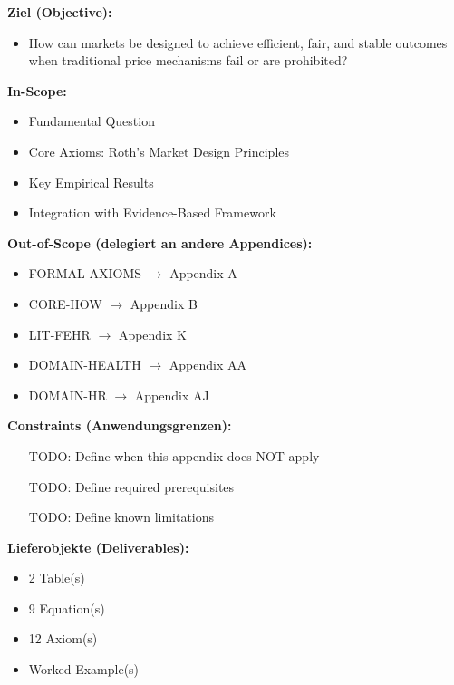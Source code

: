\begin{tcolorbox}[
    colback=orange!5!white,
    colframe=orange!75!black,
    title={\textbf{Appendix Scope: Ziel / In-Scope / Out-of-Scope / Constraints}},
    fonttitle=\bfseries
]

\textbf{Ziel (Objective):}
\begin{itemize}[nosep]
    \item How can markets be designed to achieve efficient, fair, and stable outcomes when traditional price mechanisms fail or are prohibited?
\end{itemize}

\textbf{In-Scope:}
\begin{itemize}[nosep]
    \item Fundamental Question
    \item Core Axioms: Roth's Market Design Principles
    \item Key Empirical Results
    \item Integration with Evidence-Based Framework
\end{itemize}

\textbf{Out-of-Scope (delegiert an andere Appendices):}
\begin{itemize}[nosep]
    \item FORMAL-AXIOMS $\rightarrow$ Appendix A
    \item CORE-HOW $\rightarrow$ Appendix B
    \item LIT-FEHR $\rightarrow$ Appendix K
    \item DOMAIN-HEALTH $\rightarrow$ Appendix AA
    \item DOMAIN-HR $\rightarrow$ Appendix AJ
\end{itemize}

\textbf{Constraints (Anwendungsgrenzen):}
\begin{itemize}[nosep]
    \item [TODO: Define when this appendix does NOT apply]
    \item [TODO: Define required prerequisites]
    \item [TODO: Define known limitations]
\end{itemize}

\textbf{Lieferobjekte (Deliverables):}
\begin{itemize}[nosep]
    \item 2 Table(s)
    \item 9 Equation(s)
    \item 12 Axiom(s)
    \item Worked Example(s)
\end{itemize}

\end{tcolorbox}


